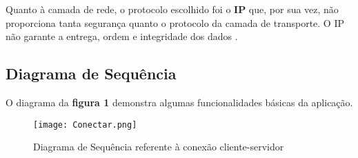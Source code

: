 \documentclass[14pt]{article}
\begin{document}
Quanto à camada de rede, o protocolo escolhido foi o \textbf{IP} que, por sua vez, não proporciona tanta segurança quanto o protocolo da camada de transporte. O IP não garante a entrega, ordem e integridade dos dados \cite{kurose}.

\subsection{Diagrama de Sequência}

O diagrama da \textbf{figura 1} demonstra algumas funcionalidades básicas da aplicação.

\begin{figure}[h]
	\centering
	\texttt{[image: Conectar.png]}
	\label{c}
	\caption{Diagrama de Sequência referente à conexão cliente-servidor}
\end{figure}

     

\end{document}
